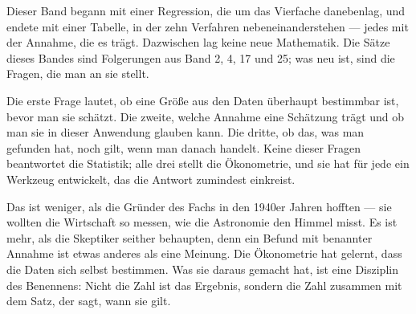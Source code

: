 \begin{merksatz}
\begin{center}
\begin{minipage}{0.9\textwidth}
Dieser Band begann mit einer Regression, die um das Vierfache danebenlag, und endete mit einer Tabelle, in der zehn Verfahren nebeneinanderstehen --- jedes mit der Annahme, die es trägt. Dazwischen lag keine neue Mathematik. Die Sätze dieses Bandes sind Folgerungen aus Band 2, 4, 17 und 25; was neu ist, sind die Fragen, die man an sie stellt.

Die erste Frage lautet, ob eine Größe aus den Daten überhaupt bestimmbar ist, bevor man sie schätzt. Die zweite, welche Annahme eine Schätzung trägt und ob man sie in dieser Anwendung glauben kann. Die dritte, ob das, was man gefunden hat, noch gilt, wenn man danach handelt. Keine dieser Fragen beantwortet die Statistik; alle drei stellt die Ökonometrie, und sie hat für jede ein Werkzeug entwickelt, das die Antwort zumindest einkreist.

Das ist weniger, als die Gründer des Fachs in den 1940er Jahren hofften --- sie wollten die Wirtschaft so messen, wie die Astronomie den Himmel misst. Es ist mehr, als die Skeptiker seither behaupten, denn ein Befund mit benannter Annahme ist etwas anderes als eine Meinung. Die Ökonometrie hat gelernt, dass die Daten sich selbst bestimmen. Was sie daraus gemacht hat, ist eine Disziplin des Benennens: Nicht die Zahl ist das Ergebnis, sondern die Zahl zusammen mit dem Satz, der sagt, wann sie gilt.
\end{minipage}
\end{center}

\begin{center}
\begin{minipage}{0.88\textwidth}
\end{minipage}
\end{center}
\end{merksatz}
